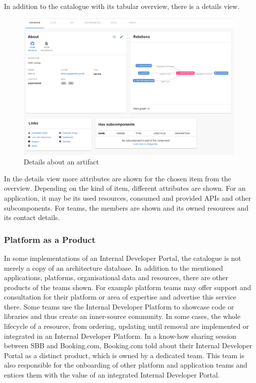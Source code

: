 \documentclass[a4paper,12pt]{article}
\begin{document}
    In addition to the catalogue with its tabular overview, there is a details view.
    \begin{figure}
        \includegraphics[width=\linewidth]{backstage_item_details}
        \caption{Details about an artifact}
        \label{fig:portaldetails}
    \end{figure}
    In the details view more attributes are shown for the chosen item from the overview.
    Depending on the kind of item, different attributes are shown.
    For an application, it may be its used resources, consumed and provided APIs and other subcomponents.
    For teams, the members are shown and its owned resources and its contact details.

    \subsubsection{Platform as a Product}
    In some implementations of an Internal Developer Portal, the catalogue is not merely a copy of an architecture database.
    In addition to the mentioned applications, platforms, organisational data and resources, there are other products
    of the teams shown.
    For example platform teams may offer support and consultation for their platform or area of expertise and advertise
    this service there.
    Some teams use the Internal Developer Platform to showcase code or libraries and thus create an inner-source community.
    In some cases, the whole lifecycle of a resource, from ordering, updating until removal are implemented or integrated
    in an Internal Developer Platform.
    In a know-how sharing session between SBB and Booking.com, Booking.com told about their Internal Developer Portal as a
    distinct product, which is owned by a dedicated team.
    This team is also responsible for the onboarding of other platform and application teams and entices them with the
    value of an integrated Internal Developer Portal.
\end{document}

